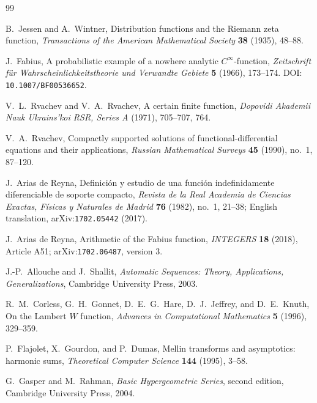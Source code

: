 \documentclass[11pt,oneside]{article}
\theoremstyle{definition}
\theoremstyle{remark}
\begin{document}
\begin{thebibliography}{99}

B.~Jessen and A.~Wintner,
\newblock Distribution functions and the Riemann zeta function,
\newblock \emph{Transactions of the American Mathematical Society} \textbf{38} (1935),
48--88.

J.~Fabius,
\newblock A probabilistic example of a nowhere analytic \(C^\infty\)-function,
\newblock \emph{Zeitschrift f\"ur Wahrscheinlichkeitstheorie und Verwandte Gebiete}
\textbf{5} (1966), 173--174.
\newblock DOI: \nolinkurl{10.1007/BF00536652}.

V.~L.~Rvachev and V.~A.~Rvachev,
\newblock A certain finite function,
\newblock \emph{Dopovidi Akademii Nauk Ukrains'koi RSR, Series A} (1971), 705--707, 764.

V.~A.~Rvachev,
\newblock Compactly supported solutions of functional-differential equations and their
applications,
\newblock \emph{Russian Mathematical Surveys} \textbf{45} (1990), no.~1, 87--120.

J.~Arias de Reyna,
\newblock Definici\'on y estudio de una funci\'on indefinidamente diferenciable de soporte
compacto,
\newblock \emph{Revista de la Real Academia de Ciencias Exactas, F\'isicas y Naturales de
Madrid} \textbf{76} (1982), no.~1, 21--38;
English translation, arXiv:\nolinkurl{1702.05442} (2017).

J.~Arias de Reyna,
\newblock Arithmetic of the Fabius function,
\newblock \emph{INTEGERS} \textbf{18} (2018), Article A51;
arXiv:\nolinkurl{1702.06487}, version 3.

J.-P.~Allouche and J.~Shallit,
\newblock \emph{Automatic Sequences: Theory, Applications, Generalizations},
\newblock Cambridge University Press, 2003.

R.~M.~Corless, G.~H.~Gonnet, D.~E.~G.~Hare, D.~J.~Jeffrey, and D.~E.~Knuth,
\newblock On the Lambert \(W\) function,
\newblock \emph{Advances in Computational Mathematics} \textbf{5} (1996), 329--359.

P.~Flajolet, X.~Gourdon, and P.~Dumas,
\newblock Mellin transforms and asymptotics: harmonic sums,
\newblock \emph{Theoretical Computer Science} \textbf{144} (1995), 3--58.

G.~Gasper and M.~Rahman,
\newblock \emph{Basic Hypergeometric Series}, second edition,
\newblock Cambridge University Press, 2004.


\end{thebibliography}
\end{document}
